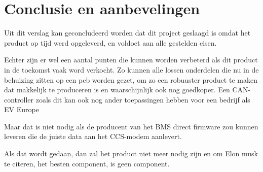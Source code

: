 \chapter{Conclusie en aanbevelingen}
\label{Conclusie_en_aanbevelingen}

Uit dit verslag kan geconcludeerd worden dat dit project geslaagd is omdat het
product op tijd werd opgeleverd, en voldoet aan alle gestelden eisen.

Echter zijn er wel een aantal punten die kunnen worden verbeterd als dit
product in de toekomst vaak word verkocht. Zo kunnen alle lossen onderdelen die
nu in de behuizing zitten op een pcb worden gezet, om zo een robuuster product
te maken dat makkelijk te produceren is en waarschijnlijk ook nog goedkoper.
Een CAN-controller zoals dit kan ook nog ander toepassingen hebben voor een
bedrijf als EV Europe

Maar dat is niet nodig als de producent van het BMS direct firmware zou kunnen
leveren die de juiste data aan het CCS-modem aanlevert.

Als dat wordt gedaan, dan zal het product niet meer nodig zijn en om Elon musk
te citeren, het besten component, is geen component.
